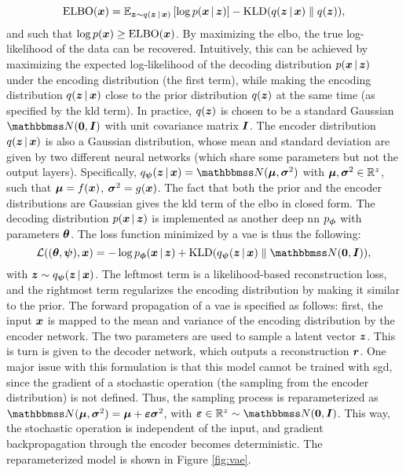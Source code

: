 $$\Fun{ELBO}(\Vector{x}) = \Expectation{\Vector{z} \sim q(\Vector{z} \given \Vector{x})}{\log p(\Vector{x} \given \Vector{z})} - \KLD{q(\Vector{z} \given \Vector{x})}{q(\Vector{z})},$$
and such that $\log p(\Vector{x}) \geq \Fun{ELBO}(\Vector{x})$. By maximizing the \gls{elbo}, the true log-likelihood of the data can be recovered. Intuitively, this can be achieved by maximizing the expected log-likelihood of the decoding distribution $p(\Vector{x} \given \Vector{z})$ under the encoding distribution (the first term), while making the encoding distribution $q(\Vector{z} \given \Vector{x})$ close to the prior distribution $q(\Vector{z})$ at the same time (as specified by the \gls{kld} term). In practice, $q(\Vector{z})$ is chosen to be a standard Gaussian $\Normal{\Zeros}{\Identity}$ with unit covariance matrix $\Identity$. The encoder distribution $q(\Vector{z} \given \Vector{x})$ is also a Gaussian distribution, whose mean and standard deviation are given by two different neural networks (which share some parameters but not the output layers). Specifically,
$\Encoder(\Vector{z} \given \Vector{x}) = \Normal{\MeanVec}{\StdVec}$ with $\boldsymbol{\mu},\boldsymbol{\sigma}^2 \in \mathbb{R}^z$, such that $\MeanVec = f(\Vector{x})$, $\StdVec = g(\Vector{x})$. The fact that both the prior and the encoder distributions are Gaussian gives the \gls{kld} term of the \gls{elbo} in closed form. The decoding distribution $p(\Vector{x} \given \Vector{z})$ is implemented as another deep \gls{nn} $p_{\boldsymbol{\phi}}$ with parameters $\boldsymbol{\theta}$. The loss function minimized by a \gls{vae} is thus the following:
$$\Loss((\Param, \EncParam), \Vector{x}) = - \log \Decoder(\Vector{x} \given \Vector{z}) + \KLD{\Encoder(\Vector{z} \given \Vector{x})}{\Normal{\Zeros}{\Identity}},$$
with $\Vector{z} \sim \Encoder(\Vector{z} \given \Vector{x})$. The leftmost term is a likelihood-based reconstruction loss, and the rightmost term regularizes the encoding distribution by making it similar to the prior. The forward propagation of a \gls{vae} is specified as follows: first, the input $\Vector{x}$ is mapped to the mean and variance of the encoding distribution by the encoder network. The two parameters are used to sample a latent vector $\Vector{z}$. This is turn is given to the decoder network, which outputs a reconstruction $\Vector{r}$. One major issue with this formulation is that this model cannot be trained with \gls{sgd}, since the gradient of a stochastic operation (the sampling from the encoder distribution) is not defined. Thus, the sampling process is reparameterized as $\Normal{\MeanVec}{\StdVec} = \MeanVec + \boldsymbol{\eps}\StdVec$, with $\boldsymbol{\eps} \in \Real^z \sim \Normal{\Zeros}{\Identity}$. This way, the stochastic operation is independent of the input, and gradient backpropagation through the encoder becomes deterministic. The reparameterized model is shown in Figure \ref{fig:vae}.
